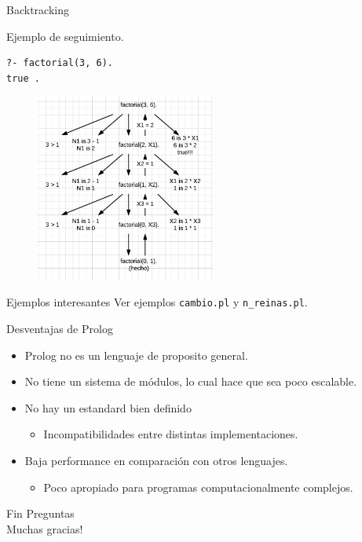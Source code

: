 \documentclass[xcolor=dvipsnames]{beamer}
\begin{document}
\begin{frame}[fragile]{Backtracking}
 
    Ejemplo de seguimiento.
    \begin{lstlisting}
?- factorial(3, 6).
true .
    \end{lstlisting}
    \begin{figure}[H]
		\centering
		\includegraphics[height=175pt]{factorial.png}
	\end{figure}

\end{frame}

\begin{frame}[fragile]{Ejemplos interesantes}
Ver ejemplos \verb|cambio.pl| y \verb|n_reinas.pl|.
\end{frame}

\begin{frame}[fragile]{Desventajas de Prolog}
    \begin{itemize}
        \item Prolog no es un lenguaje de proposito general.
        \item No tiene un sistema de módulos, lo cual hace que sea poco escalable.
        \item No hay un estandard bien definido
        \begin{itemize}
            \item Incompatibilidades entre distintas implementaciones.
        \end{itemize}
        \item Baja performance en comparación con otros lenguajes.
        \begin{itemize}
            \item Poco apropiado para programas computacionalmente complejos.
        \end{itemize}
    \end{itemize}
\end{frame}

\begin{frame}[fragile]{Fin}
    Preguntas \\
    \pause
    Muchas gracias!
\end{frame}
\end{document}
